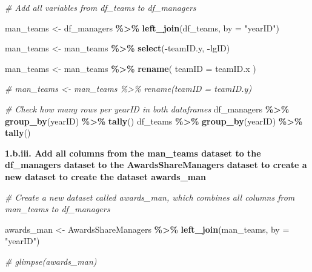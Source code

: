 \documentclass[
]{article}
\newenvironment{Shaded}{\begin{snugshade}}{\end{snugshade}}
\newcommand{\AttributeTok}[1]{\textcolor[rgb]{0.13,0.29,0.53}{#1}}
\newcommand{\CommentTok}[1]{\textcolor[rgb]{0.56,0.35,0.01}{\textit{#1}}}
\newcommand{\FunctionTok}[1]{\textcolor[rgb]{0.13,0.29,0.53}{\textbf{#1}}}
\newcommand{\NormalTok}[1]{#1}
\newcommand{\OtherTok}[1]{\textcolor[rgb]{0.56,0.35,0.01}{#1}}
\newcommand{\SpecialCharTok}[1]{\textcolor[rgb]{0.81,0.36,0.00}{\textbf{#1}}}
\newcommand{\StringTok}[1]{\textcolor[rgb]{0.31,0.60,0.02}{#1}}
\begin{document}
\begin{Shaded}
\begin{Highlighting}[]
\CommentTok{\# Add all variables from df\_teams to df\_managers}

\NormalTok{man\_teams }\OtherTok{\textless{}{-}}\NormalTok{ df\_managers }\SpecialCharTok{\%\textgreater{}\%} \FunctionTok{left\_join}\NormalTok{(df\_teams, }\AttributeTok{by =} \StringTok{"yearID"}\NormalTok{)}

\NormalTok{man\_teams }\OtherTok{\textless{}{-}}\NormalTok{ man\_teams }\SpecialCharTok{\%\textgreater{}\%} 
  \FunctionTok{select}\NormalTok{(}\SpecialCharTok{{-}}\NormalTok{teamID.y, }\SpecialCharTok{{-}}\NormalTok{lgID)}

\NormalTok{man\_teams }\OtherTok{\textless{}{-}}\NormalTok{ man\_teams }\SpecialCharTok{\%\textgreater{}\%}
  \FunctionTok{rename}\NormalTok{(}
    \AttributeTok{teamID =}\NormalTok{ teamID.x}
\NormalTok{  )}

\CommentTok{\# man\_teams \textless{}{-} man\_teams \%\textgreater{}\% rename(teamID = teamID.y)}

\CommentTok{\# Check how many rows per yearID in both dataframes}
\NormalTok{df\_managers }\SpecialCharTok{\%\textgreater{}\%} \FunctionTok{group\_by}\NormalTok{(yearID) }\SpecialCharTok{\%\textgreater{}\%} \FunctionTok{tally}\NormalTok{()}
\NormalTok{df\_teams }\SpecialCharTok{\%\textgreater{}\%} \FunctionTok{group\_by}\NormalTok{(yearID) }\SpecialCharTok{\%\textgreater{}\%} \FunctionTok{tally}\NormalTok{()}
\end{Highlighting}
\end{Shaded}

\textbf{1.b.iii. Add all columns from the man\_teams dataset to the
df\_managers dataset to the AwardsShareManagers dataset to create a new
dataset to create the dataset awards\_man}

\begin{Shaded}
\begin{Highlighting}[]
\CommentTok{\# Create a new dataset called awards\_man, which combines all columns from man\_teams to df\_managers}

\NormalTok{awards\_man }\OtherTok{\textless{}{-}}\NormalTok{ AwardsShareManagers }\SpecialCharTok{\%\textgreater{}\%} \FunctionTok{left\_join}\NormalTok{(man\_teams, }\AttributeTok{by =}  \StringTok{"yearID"}\NormalTok{) }

\CommentTok{\# glimpse(awards\_man)}
\end{Highlighting}
\end{Shaded}
\end{document}
